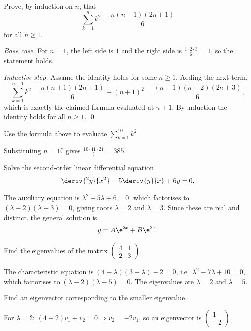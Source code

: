 \documentclass[a4paper,12pt]{article}
\begin{document}
\maketitle

\begin{question}
\qpart
Prove, by induction on $n$, that
\[
  \sum_{k=1}^{n} k^2 = \frac{n(n+1)(2n+1)}{6}
\]
for all $n \geq 1$.

\emph{Base case.} For $n=1$, the left side is $1$ and the right side is
$\frac{1\cdot 2\cdot 3}{6} = 1$, so the statement holds.

\emph{Inductive step.} Assume the identity holds for some $n \geq 1$.
Adding the next term,
\[
  \sum_{k=1}^{n+1} k^2 = \frac{n(n+1)(2n+1)}{6} + (n+1)^2
  = \frac{(n+1)(n+2)(2n+3)}{6},
\]
which is exactly the claimed formula evaluated at $n+1$. By induction the
identity holds for all $n \geq 1$. \hfill\qed

\qpart
Use the formula above to evaluate $\sum_{k=1}^{10} k^2$.

Substituting $n=10$ gives
$\frac{10 \cdot 11 \cdot 21}{6} = 385$.

\end{question}

\begin{question}
Solve the second-order linear differential equation
\[
  \deriv{^2y}{x^2} - 5\deriv{y}{x} + 6y = 0.
\]

The auxiliary equation is $\lambda^2 - 5\lambda + 6 = 0$, which factorises
to $(\lambda - 2)(\lambda - 3) = 0$, giving roots $\lambda = 2$ and
$\lambda = 3$. Since these are real and distinct, the general solution is
\[
  y = A\e^{2x} + B\e^{3x}.
\]

\end{question}

\begin{question}[4]
\qsubpart
Find the eigenvalues of the matrix
$\begin{pmatrix} 4 & 1 \\ 2 & 3 \end{pmatrix}$.

The characteristic equation is
$(4-\lambda)(3-\lambda) - 2 = 0$, i.e.\ $\lambda^2 - 7\lambda + 10 = 0$,
which factorises to $(\lambda-2)(\lambda-5)=0$. The eigenvalues are
$\lambda = 2$ and $\lambda = 5$.

\qsubpart
Find an eigenvector corresponding to the smaller eigenvalue.

For $\lambda = 2$: $(4-2)v_1 + v_2 = 0 \Rightarrow v_2 = -2v_1$, so an
eigenvector is $\begin{pmatrix} 1 \\ -2 \end{pmatrix}$.

\end{question}
\end{document}

